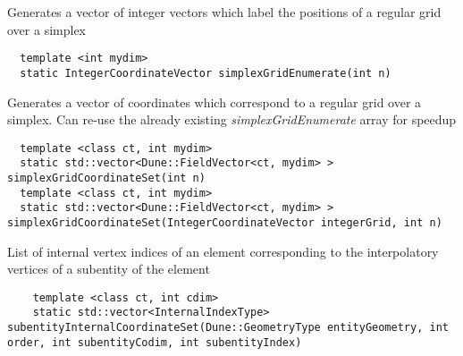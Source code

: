\noindent
Generates a vector of integer vectors which label the positions of a regular grid over a simplex \\

\begin{mybox}
\begin{lstlisting}
  template <int mydim>
  static IntegerCoordinateVector simplexGridEnumerate(int n)
\end{lstlisting}
\end{mybox}

\noindent
Generates a vector of coordinates which correspond to a regular grid over a simplex. Can re-use the already existing \textit{simplexGridEnumerate} array for speedup \\

\begin{mybox}
\begin{lstlisting}
  template <class ct, int mydim>
  static std::vector<Dune::FieldVector<ct, mydim> > simplexGridCoordinateSet(int n)
  template <class ct, int mydim>
  static std::vector<Dune::FieldVector<ct, mydim> > simplexGridCoordinateSet(IntegerCoordinateVector integerGrid, int n)
\end{lstlisting}
\end{mybox}


\noindent
List of internal vertex indices of an element corresponding to the interpolatory vertices of a subentity of the element

\begin{mybox}
\begin{lstlisting}
    template <class ct, int cdim>
    static std::vector<InternalIndexType> subentityInternalCoordinateSet(Dune::GeometryType entityGeometry, int order, int subentityCodim, int subentityIndex)
\end{lstlisting}
\end{mybox}

